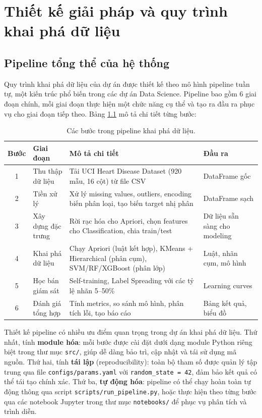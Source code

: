 \chapter{Thiết kế giải pháp và quy trình khai phá dữ liệu}\label{chapter_pipeline}

\section{Pipeline tổng thể của hệ thống}

Quy trình khai phá dữ liệu của dự án được thiết kế theo mô hình pipeline tuần tự, một kiến trúc phổ biến trong các dự án Data Science. Pipeline bao gồm 6 giai đoạn chính, mỗi giai đoạn thực hiện một chức năng cụ thể và tạo ra đầu ra phục vụ cho giai đoạn tiếp theo. Bảng \ref{tab:pipeline_steps} mô tả chi tiết từng bước:

\begin{table}[H]
\centering
\caption{Các bước trong pipeline khai phá dữ liệu.}
\label{tab:pipeline_steps}
\begin{tabular}{|c|l|p{5.5cm}|p{3.5cm}|}
\hline
\textbf{Bước} & \textbf{Giai đoạn} & \textbf{Mô tả chi tiết} & \textbf{Đầu ra} \\ \hline
1 & Thu thập dữ liệu & Tải UCI Heart Disease Dataset (920 mẫu, 16 cột) từ file CSV & DataFrame gốc \\ \hline
2 & Tiền xử lý & Xử lý missing values, outliers, encoding biến phân loại, tạo biến target nhị phân & DataFrame sạch \\ \hline
3 & Xây dựng đặc trưng & Rời rạc hóa cho Apriori, chọn features cho Classification, chia train/test & Dữ liệu sẵn sàng cho modeling \\ \hline
4 & Khai phá dữ liệu & Chạy Apriori (luật kết hợp), KMeans + Hierarchical (phân cụm), SVM/RF/XGBoost (phân lớp) & Luật, nhãn cụm, mô hình \\ \hline
5 & Học bán giám sát & Self-training, Label Spreading với các tỷ lệ nhãn 5--50\% & Learning curves \\ \hline
6 & Đánh giá tổng hợp & Tính metrics, so sánh mô hình, phân tích lỗi, tạo báo cáo & Bảng kết quả, biểu đồ \\ \hline
\end{tabular}
\end{table}

Thiết kế pipeline có nhiều ưu điểm quan trọng trong dự án khai phá dữ liệu. Thứ nhất, tính \textbf{module hóa}: mỗi bước được cài đặt dưới dạng module Python riêng biệt trong thư mục \texttt{src/}, giúp dễ dàng bảo trì, cập nhật và tái sử dụng mã nguồn. Thứ hai, tính \textbf{tái lập} (reproducibility): toàn bộ tham số được quản lý tập trung qua file \texttt{configs/params.yaml} với \texttt{random\_state = 42}, đảm bảo kết quả có thể tái tạo chính xác. Thứ ba, \textbf{tự động hóa}: pipeline có thể chạy hoàn toàn tự động thông qua script \texttt{scripts/run\_pipeline.py}, hoặc thực hiện theo từng bước qua các notebook Jupyter trong thư mục \texttt{notebooks/} để phục vụ phân tích và trình diễn.

